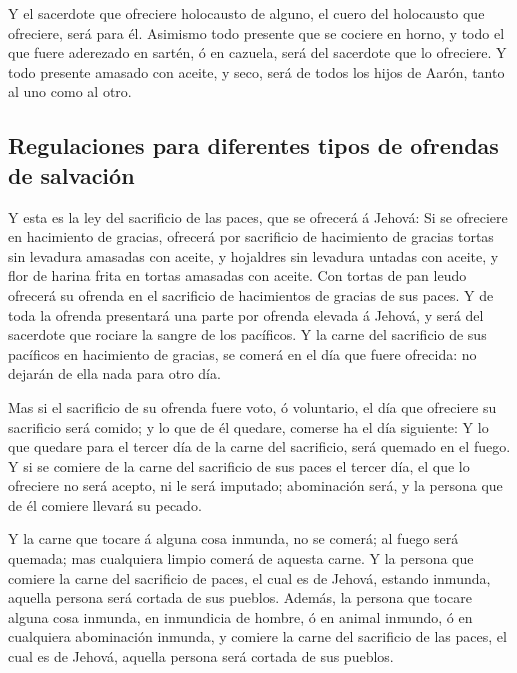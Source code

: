  Y el sacerdote que ofreciere holocausto de alguno, el
cuero del holocausto que ofreciere, será para él. 
Asimismo todo presente que se cociere en horno, y todo el que fuere
aderezado en sartén, ó en cazuela, será del sacerdote que lo ofreciere.
 Y todo presente amasado con aceite, y seco, será de
todos los hijos de Aarón, tanto al uno como al otro.

\hypertarget{regulaciones-para-diferentes-tipos-de-ofrendas-de-salvaciuxf3n}{%
\subsection{Regulaciones para diferentes tipos de ofrendas de
salvación}\label{regulaciones-para-diferentes-tipos-de-ofrendas-de-salvaciuxf3n}}

 Y esta es la ley del sacrificio de las paces, que se
ofrecerá á Jehová:  Si se ofreciere en hacimiento de
gracias, ofrecerá por sacrificio de hacimiento de gracias tortas sin
levadura amasadas con aceite, y hojaldres sin levadura untadas con
aceite, y flor de harina frita en tortas amasadas con aceite.
 Con tortas de pan leudo ofrecerá su ofrenda en el
sacrificio de hacimientos de gracias de sus paces.  Y de
toda la ofrenda presentará una parte por ofrenda elevada á Jehová, y
será del sacerdote que rociare la sangre de los pacíficos.
 Y la carne del sacrificio de sus pacíficos en hacimiento
de gracias, se comerá en el día que fuere ofrecida: no dejarán de ella
nada para otro día.

 Mas si el sacrificio de su ofrenda fuere voto, ó
voluntario, el día que ofreciere su sacrificio será comido; y lo que de
él quedare, comerse ha el día siguiente:  Y lo que
quedare para el tercer día de la carne del sacrificio, será quemado en
el fuego.  Y si se comiere de la carne del sacrificio de
sus paces el tercer día, el que lo ofreciere no será acepto, ni le será
imputado; abominación será, y la persona que de él comiere llevará su
pecado.

 Y la carne que tocare á alguna cosa inmunda, no se
comerá; al fuego será quemada; mas cualquiera limpio comerá de aquesta
carne.  Y la persona que comiere la carne del sacrificio
de paces, el cual es de Jehová, estando inmunda, aquella persona será
cortada de sus pueblos.  Además, la persona que tocare
alguna cosa inmunda, en inmundicia de hombre, ó en animal inmundo, ó en
cualquiera abominación inmunda, y comiere la carne del sacrificio de las
paces, el cual es de Jehová, aquella persona será cortada de sus
pueblos.

